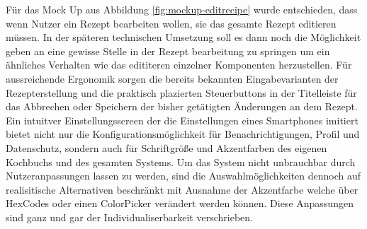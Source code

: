 Für das Mock Up aus Abbildung \ref{fig:mockup-editrecipe} wurde entschieden, dass wenn Nutzer ein Rezept bearbeiten wollen, sie das gesamte Rezept editieren müssen. In der späteren technischen Umsetzung soll es dann noch die Möglichkeit geben an eine gewisse Stelle in der Rezept bearbeitung zu springen um ein ähnliches Verhalten wie das edititeren einzelner Komponenten herzustellen. Für aussreichende Ergonomik sorgen die bereits bekannten Eingabevarianten der Rezepterstellung und die praktisch plazierten Steuerbuttons in der Titelleiste für das Abbrechen oder Speichern der bisher getätigten Änderungen an dem Rezept. \\
Ein intuitver Einstellungsscreen der die Einstellungen eines Smartphones imitiert bietet nicht nur die Konfigurationsmöglichkeit für Benachrichtigungen, Profil und Datenschutz, sondern auch für Schriftgröße und Akzentfarben des eigenen Kochbuchs und des gesamten Systems. Um das System nicht unbrauchbar durch Nutzeranpassungen lassen zu werden, sind die Auswahlmöglichkeiten dennoch auf realisitische Alternativen beschränkt mit Ausnahme der Akzentfarbe welche über HexCodes oder einen ColorPicker verändert werden können. Diese Anpassungen sind ganz und gar der Individualiserbarkeit verschrieben. \\

